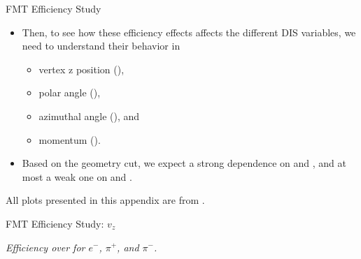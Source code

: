 \begin{frame}{FMT Efficiency Study}
    \label{20.04::fmt_efficiency_study}
    \begin{itemize}
        \item
            Then, to see how these efficiency effects affects the different DIS variables, we need to understand their behavior in

            \vspace{6pt}
            \begin{itemize}
                \item
                    vertex z position (),

                \item
                    polar angle (\ef{$\theta$}),

                \item
                    azimuthal angle (\ef{$\varphi$}), and

                \item
                    momentum ().
            \end{itemize}

        \vspace{12pt}
        \item
            Based on the geometry cut, we expect a strong dependence on  and \ef{$\theta$}, and at most a weak one on \ef{$\varphi$} and .
    \end{itemize}

    \vspace{12pt}
    \ef{*}All plots presented in this appendix are from .

\end{frame}

\begin{frame}{FMT Efficiency Study: $v_z$}
    \begin{center}
        \vspace{-6pt}
        \begin{figure}[t]
        \end{figure}
        \scriptsize{\textit{Efficiency over  for $e^-$, $\pi^+$, and $\pi^-$.}}
    \end{center}

\end{frame}

